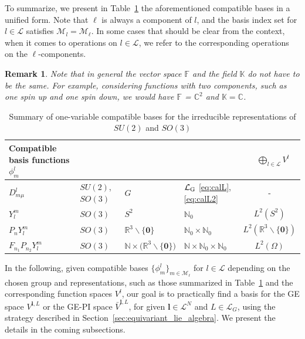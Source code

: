 \documentclass{article}
\newcommand{\bV}{{\bar V}}
\newtheorem{remark}[theorem]{Remark}
\numberwithin{equation}{section}
\def\N{\mathbb{N}}
\def\K{\mathbb{K}}
\def\R{\mathbb{R}}
\def\C{\mathbb{C}}
\def\F{\mathbb{F}}
\def\bl{{\bm l}}
\def\calM{\mathcal{M}}
\def\calL{\mathcal{L}}
\def\calLG{\mathcal{\calL_{\rm G}}}
\begin{document}
{\medskip

To summarize, we present in Table~\ref{tab:comp_bases} the aforementioned compatible bases in a unified form.
Note that $\ell$ is always a component of $l$, and the basis index set for $l\in\calL$ satisfies $\calM_l = \calM_\ell$.
In some cases that should be clear from the context, when it comes to operations on $l\in\calL$, we refer to the corresponding operations on the $\ell$-components.


\begin{remark}
    Note that in general the vector space $\F$ and the field $\K$ do not have to be the same. For example, considering functions with two components, such as one spin up and one spin down, we would have $\F$ = $\C^2$ and $\K=\C$.
\end{remark}

\begin{table}[htb!]
\centering
\caption{Summary of one-variable compatible bases for the irreducible representations of $SU(2)$ and $SO(3)$}
\label{tab:comp_bases}
\begin{tabular}{|m{3cm}|m{3.4cm}|m{2cm}|m{2.5cm}|c|}
    \hline
    \centering Compatible basis functions $\phi^l_m$ & \centering {Applicable groups $G$} & \centering{Domain $\Omega$} & \centering{Index set $\calL$} & 
    {$\;\;\; \displaystyle\bigoplus_{l\in\calL} V^l$}
    \\
    \hline
    \centering $D^l_{m\mu}$ & \centering  $SU(2)$, $SO(3)$ & \centering   $G$   &  \centering    $\calLG$ \eqref{eq:calL}, \eqref{eq:calL2}    & -         \\
    \hline
    \centering $Y_l^m$    &  \centering    $SO(3)$      &  \centering  $S^2$ & \centering    $\N_0$       & $L^2(S^2)$ \\
    \hline
    \centering $P_nY_l^m$ & \centering     $SO(3)$      &  \centering $\R^3\backslash\{\mathbf{0}\}$ & \centering $\N_0\times\N_0$ & $L^2(\R^3\backslash\{\mathbf{0}\})$ \\
    \hline
    \centering $F_{n_1} P_{n_2} Y_l^m$ & \centering     $SO(3)$      & \centering  $\N\times\big(\R^3\backslash\{\mathbf{0}\}\big)$ & \centering $\N\times\N_0\times\N_0$ & $L^2(\Omega)$ \\
    \hline
\end{tabular}
\end{table}


In the following, given compatible bases $\{\phi^l_m\}_{m\in\calM_\ell}$ for $l\in \calL$ depending on the chosen group and representations, such as those summarized in Table~\ref{tab:comp_bases} and the corresponding function spaces $V^l$, our goal is to practically find a basis for the GE space $V^{\bl,L}$ or the GE-PI space $\bV^{\bl,L}$, for given $\bl\in\calL^N$ and $L\in\calL_G$, using the strategy described in Section~\ref{sec:equivariant_lie_algebra}. We present the details in the coming subsections.


}
\end{document}

